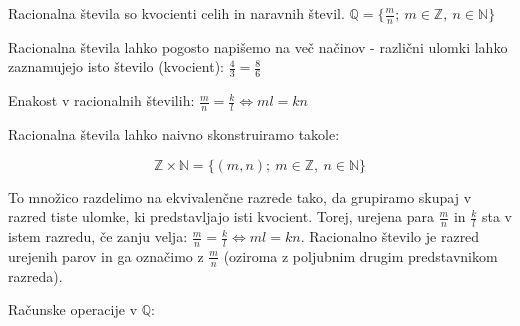 \documentclass[a4paper]{article}
\newcommand{\nn}{\mathbb{N}} %
\newcommand{\zz}{\mathbb{Z}} %
\newcommand{\qq}{\mathbb{Q}} %
\begin{document}
Racionalna števila so kvocienti celih in naravnih števil. $\qq = \{\frac{m}{n};~ m \in \zz,~ n \in \nn\}$

Racionalna števila lahko pogosto napišemo na več načinov - različni ulomki lahko zaznamujejo isto število (kvocient):
$\frac{4}{3} = \frac{8}{6}$

Enakost v racionalnih številih:
$\frac{m}{n} = \frac{k}{l} \Leftrightarrow ml = kn$

Racionalna števila lahko naivno skonstruiramo takole:

\begin{equation}
  \zz \times \nn = \{(m,n);~ m \in \zz,~ n \in \nn\}
\end{equation}

To množico razdelimo na ekvivalenčne razrede tako, da grupiramo skupaj v razred tiste ulomke, ki
predstavljajo isti kvocient. Torej, urejena para $\frac{m}{n}$ in $\frac{k}{l}$ sta v istem razredu, če zanju velja:
$\frac{m}{n} = \frac{k}{l} \Leftrightarrow ml = kn$.
Racionalno število je razred urejenih parov in ga označimo z $\frac{m}{n}$ (oziroma z poljubnim drugim predstavnikom
razreda).

Računske operacije v $\qq$:
\end{document}
